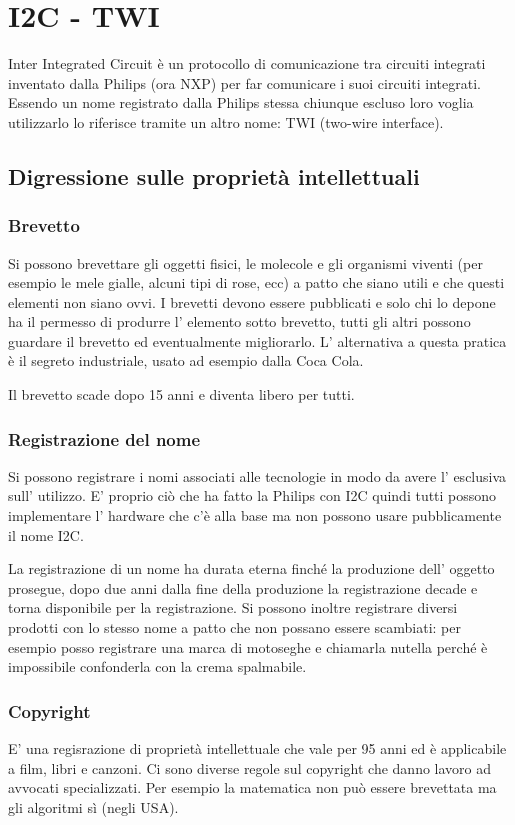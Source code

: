\section{I2C - TWI}
Inter Integrated Circuit è un protocollo di comunicazione tra circuiti integrati inventato dalla Philips (ora NXP) per far comunicare i suoi circuiti integrati.
Essendo un nome registrato dalla Philips stessa chiunque escluso loro voglia utilizzarlo lo riferisce tramite un altro nome: TWI (two-wire interface).

\subsection{Digressione sulle proprietà intellettuali}
\subsubsection{Brevetto}
Si possono brevettare gli oggetti fisici, le molecole e gli organismi viventi (per esempio le mele gialle, alcuni tipi di rose, ecc) a patto che siano utili e che questi elementi non siano ovvi.
I brevetti devono essere pubblicati e solo chi lo depone ha il permesso di produrre l' elemento sotto brevetto, tutti gli altri possono guardare il brevetto ed eventualmente migliorarlo.
L' alternativa a questa pratica è il segreto industriale, usato ad esempio dalla Coca Cola.

Il brevetto scade dopo 15 anni e diventa libero per tutti.

\subsubsection{Registrazione del nome}
Si possono registrare i nomi associati alle tecnologie in modo da avere l' esclusiva sull' utilizzo.
E' proprio ciò che ha fatto la Philips con I2C quindi tutti possono implementare l' hardware che c'è alla base ma non possono usare pubblicamente il nome I2C.

La registrazione di un nome ha durata eterna finché la produzione dell' oggetto prosegue, dopo due anni dalla fine della produzione la registrazione decade e torna disponibile per la registrazione.
Si possono inoltre registrare diversi prodotti con lo stesso nome a patto che non possano essere scambiati:
per esempio posso registrare una marca di motoseghe e chiamarla nutella perché è impossibile confonderla con la crema spalmabile.

\subsubsection{Copyright}
E' una regisrazione di proprietà intellettuale che vale per 95 anni ed è applicabile a film, libri e canzoni.
Ci sono diverse regole sul copyright che danno lavoro ad avvocati specializzati.
Per esempio la matematica non può essere brevettata ma gli algoritmi sì (negli USA).

